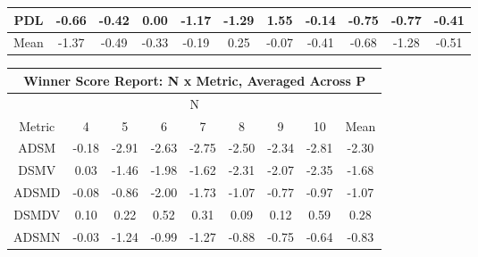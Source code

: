 \begin{longtable}{ | c || c | c | c | c | c | c | c | c | c || c |}
PDL &  \cellcolor[HTML]{FFEFEF} -0.66 &  \cellcolor[HTML]{FFF7F7} -0.42 &  \cellcolor[HTML]{FFFFFF} 0.00 &  \cellcolor[HTML]{FFDFDF} -1.17 &  \cellcolor[HTML]{FFDFDF} -1.29 &  \cellcolor[HTML]{D7D7FF} 1.55 &  \cellcolor[HTML]{FFFFFF} -0.14 &  \cellcolor[HTML]{FFEFEF} -0.75 &  \cellcolor[HTML]{FFEFEF} -0.77 &  \cellcolor[HTML]{FFF7F7} -0.41 \\
\hline
\hline
Mean  &  \cellcolor[HTML]{FFDFDF} -1.37 &  \cellcolor[HTML]{FFEFEF} -0.49 &  \cellcolor[HTML]{FFF7F7} -0.33 &  \cellcolor[HTML]{FFF7F7} -0.19 &  \cellcolor[HTML]{F7F7FF} 0.25 &  \cellcolor[HTML]{FFFFFF} -0.07 &  \cellcolor[HTML]{FFF7F7} -0.41 &  \cellcolor[HTML]{FFEFEF} -0.68 &  \cellcolor[HTML]{FFDFDF} -1.28 &  \cellcolor[HTML]{FFEFEF} -0.51 \\
\hline
\end{longtable}
\begin{longtable}{ | c || c | c | c | c | c | c | c || c |}
\hline
\multicolumn{9}{|c|}{ Winner Score Report: N x Metric, Averaged Across P } \\
\hline
\multicolumn{9}{|c|}{ N } \\
\hline
Metric & 4 & 5 & 6 & 7 & 8 & 9 & 10 & Mean\\
\hline
\hline
\endhead
ADSM &  \cellcolor[HTML]{FFF7F7} -0.18 &  \cellcolor[HTML]{FFB7B7} -2.91 &  \cellcolor[HTML]{FFBFBF} -2.63 &  \cellcolor[HTML]{FFB7B7} -2.75 &  \cellcolor[HTML]{FFBFBF} -2.50 &  \cellcolor[HTML]{FFC7C7} -2.34 &  \cellcolor[HTML]{FFB7B7} -2.81 &  \cellcolor[HTML]{FFC7C7} -2.30 \\
DSMV &  \cellcolor[HTML]{FFFFFF} 0.03 &  \cellcolor[HTML]{FFD7D7} -1.46 &  \cellcolor[HTML]{FFCFCF} -1.98 &  \cellcolor[HTML]{FFD7D7} -1.62 &  \cellcolor[HTML]{FFC7C7} -2.31 &  \cellcolor[HTML]{FFC7C7} -2.07 &  \cellcolor[HTML]{FFC7C7} -2.35 &  \cellcolor[HTML]{FFD7D7} -1.68 \\
ADSMD &  \cellcolor[HTML]{FFFFFF} -0.08 &  \cellcolor[HTML]{FFE7E7} -0.86 &  \cellcolor[HTML]{FFCFCF} -2.00 &  \cellcolor[HTML]{FFD7D7} -1.73 &  \cellcolor[HTML]{FFE7E7} -1.07 &  \cellcolor[HTML]{FFEFEF} -0.77 &  \cellcolor[HTML]{FFE7E7} -0.97 &  \cellcolor[HTML]{FFE7E7} -1.07 \\
DSMDV &  \cellcolor[HTML]{FFFFFF} 0.10 &  \cellcolor[HTML]{F7F7FF} 0.22 &  \cellcolor[HTML]{EFEFFF} 0.52 &  \cellcolor[HTML]{F7F7FF} 0.31 &  \cellcolor[HTML]{FFFFFF} 0.09 &  \cellcolor[HTML]{FFFFFF} 0.12 &  \cellcolor[HTML]{EFEFFF} 0.59 &  \cellcolor[HTML]{F7F7FF} 0.28 \\
ADSMN &  \cellcolor[HTML]{FFFFFF} -0.03 &  \cellcolor[HTML]{FFDFDF} -1.24 &  \cellcolor[HTML]{FFE7E7} -0.99 &  \cellcolor[HTML]{FFDFDF} -1.27 &  \cellcolor[HTML]{FFE7E7} -0.88 &  \cellcolor[HTML]{FFEFEF} -0.75 &  \cellcolor[HTML]{FFEFEF} -0.64 &  \cellcolor[HTML]{FFE7E7} -0.83 \\

\end{longtable}
